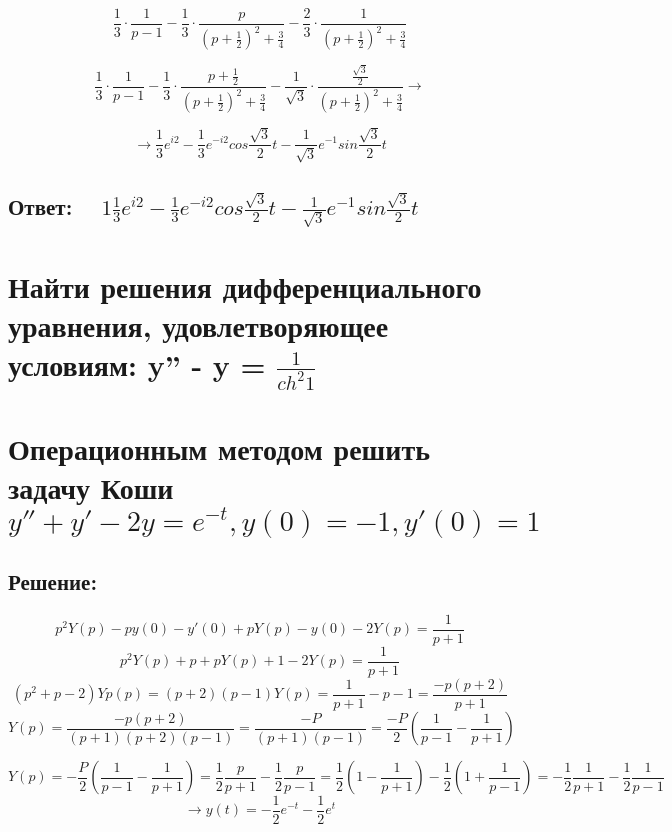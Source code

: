 \documentclass{article}
\begin{document}
	\[
		\frac{1}{3}\cdot \frac{1}{p-1}-\frac{1}{3}\cdot \frac{p}{(p + \frac{1}{2})^{2}
		+ \frac{3}{4}}- \frac{2}{3}\cdot \frac{1}{(p + \frac{1}{2})^{2} + \frac{3}{4}}
	\]

	\[
		\frac{1}{3}\cdot \frac{1}{p-1}-\frac{1}{3}\cdot \frac{p + \frac{1}{2}}{(p + \frac{1}{2})^{2}
		+ \frac{3}{4}}- \frac{1}{\sqrt{3}}\cdot \frac{\frac{\sqrt{3}}{2}}{(p + \frac{1}{2})^{2}
		+ \frac{3}{4}}\rightarrow
	\]

	\[
		\rightarrow \frac{1}{3}e^{i2}- \frac{1}{3}e^{-i2}cos\frac{\sqrt{3}}{2}t - \frac{1}{\sqrt{3}}
		e^{-1}sin\frac{\sqrt{3}}{2}t
	\]

	\subsection{Ответ: $\quad 1\frac{1}{3}e^{i2}- \frac{1}{3}e^{-i2}cos\frac{\sqrt{3}}{2}
	t - \frac{1}{\sqrt{3}}e^{-1}sin\frac{\sqrt{3}}{2}t$}

	\vspace{1cm}
	\section{ Найти решения дифференциального уравнения, удовлетворяющее условиям:
	y'' - y = $\frac{1}{ch^{2}1}$ }

	\vspace{1cm}
	\section{Операционным методом решить задачу Коши
	$y'' + y' - 2y = e^{-t}, y(0) = -1, y'(0) = 1$ }
	\subsection{Решение:}

	\[
		p^{2}Y(p) - py(0) - y'(0) + pY(p) - y(0) -2Y(p) = \frac{1}{p+1}
	\]
	\[
		p^{2}Y(p) + p + pY(p)+1 - 2Y(p) = \frac{1}{p+1}
	\]
	\[
		(p^{2} + p - 2)Yp(p) = (p+2)(p-1)Y(p) = \frac{1}{p+1}-p-1 = \frac{-p(p+2)}{p+1}
	\]
	\[
		Y(p) = \frac{-p(p+2)}{(p+1)(p+2)(p-1)}= \frac{-P}{(p+1)(p-1)}= \frac{-P}{2}(\frac{1}{p-1}
		- \frac{1}{p+1})
	\]


	\[
		Y(p) = -\frac{P}{2}\left(\frac{1}{p-1}- \frac{1}{p+1}\right) = \frac{1}{2}\frac{p}{p+1}
		-\frac{1}{2}\frac{p}{p-1}= \frac{1}{2}\left(1 - \frac{1}{p+1}\right) - \frac{1}{2}
		\left(1 + \frac{1}{p-1}\right) = -\frac{1}{2}\frac{1}{p+1}- \frac{1}{2}\frac{1}{p-1}
	\]
	\[
		\rightarrow y(t) = -\frac{1}{2}e^{-t}- \frac{1}{2}e^{t}
	\]
\end{document}

